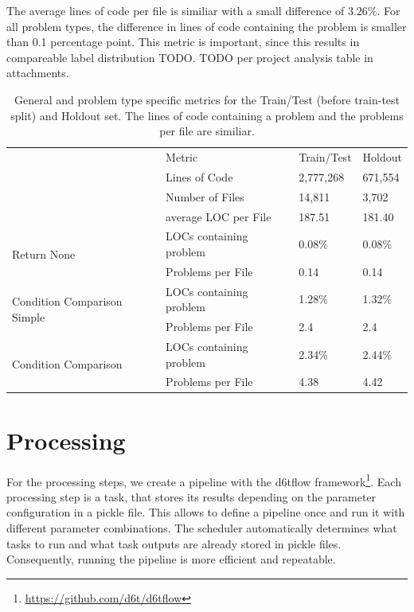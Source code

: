 The average lines of code per file is similiar with a small difference of 3.26\%. For all problem types, the difference in lines of code containing the problem is smaller than 0.1 percentage point. This metric is important, since this results in compareable label distribution TODO.
TODO per project analysis table in attachments.

\begin{table}[]
    \begin{tabular}{@{}llll@{}}
        \toprule
    \multirow{4}{*}{}                            & Metric                  & Train/Test & Holdout \\ \cmidrule(l){2-4} 
                                                 & Lines of Code           & 2,777,268  & 671,554 \\
                                                 & Number of Files         & 14,811     & 3,702   \\
                                                 & average LOC per File    & 187.51     & 181.40     \\ \midrule
    \multirow{2}{*}{Return None}                 & LOCs containing problem & 0.08\%     & 0.08\%  \\
                                                 & Problems per File       & 0.14       & 0.14    \\ \midrule
    \multirow{2}{*}{Condition Comparison Simple} & LOCs containing problem & 1.28\%      & 1.32\%  \\
                                                 & Problems per File       & 2.4       & 2.4    \\ \midrule
    \multirow{2}{*}{Condition Comparison}        & LOCs containing problem & 2.34\%     & 2.44\%  \\
                                                 & Problems per File       & 4.38       & 4.42    \\ \bottomrule
    \end{tabular}
    \caption{General and problem type specific metrics for the Train/Test (before train-test split) and Holdout set. The lines of code containing a problem and the problems per file are similiar.}
    \label{tab:general_data_distribution}
\end{table}

\section{Processing}
For the processing steps, we create a pipeline with the d6tflow framework\footnote{\url{https://github.com/d6t/d6tflow}}. Each processing step is a task, that stores its results depending on the parameter configuration in a pickle file. This allows to define a pipeline once and run it with different parameter combinations. The scheduler automatically determines what tasks to run and what task outputs are already stored in pickle files. Consequently, running the pipeline is more efficient and repeatable.

